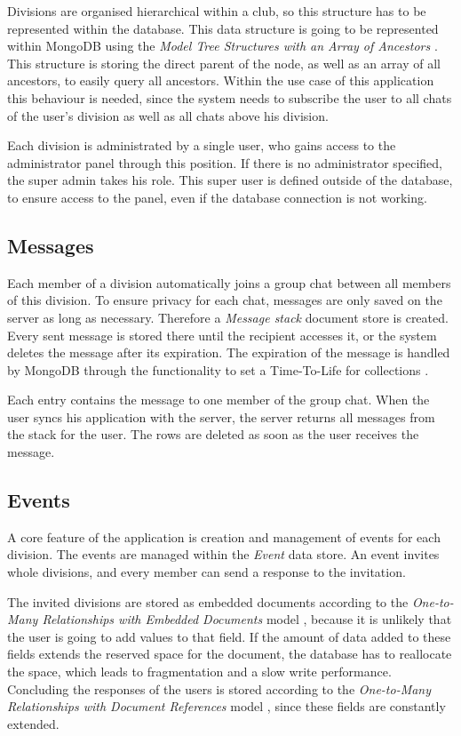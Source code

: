 Divisions are organised hierarchical within a club, so this structure has to be represented within the database. This data structure is going to be represented within MongoDB using the \emph{Model Tree Structures with an Array of Ancestors} \cite[p. 149]{Mongo:2014aa}. This structure is storing the direct parent of the node, as well as an array of all ancestors, to easily query all ancestors. Within the use case of this application this behaviour is needed, since the system needs to subscribe the user to all chats of the user's division as well as all chats above his division.

Each division is administrated by a single user, who gains access to the administrator panel through this position. If there is no administrator specified, the super admin takes his role. This super user is defined outside of the database, to ensure access to the panel, even if the database connection is not working.

\subsection{Messages}
Each member of a division automatically joins a group chat between all members of this division. To ensure privacy for each chat, messages are only saved on the server as long as necessary. Therefore a \emph{Message stack} document store is created. Every sent message is stored there until the recipient accesses it, or the system deletes the message after its expiration. The expiration of the message is handled by MongoDB through the functionality to set a Time-To-Life for collections \cite[p. 198]{Mongo:2014aa}.

Each entry contains the message to one member of the group chat. When the user syncs his application with the server, the server returns all messages from the stack for the user. The rows are deleted as soon as the user receives the message. 

\subsection{Events}
A core feature of the application is creation and management of events for each division. The events are managed within the \emph{Event} data store. An event invites whole divisions, and every member can send a response to the invitation. 

The invited divisions are stored as embedded documents according to the \emph{One-to-Many Relationships with Embedded Documents} model \cite[p. 141]{Mongo:2014aa}, because it is unlikely that the user is going to add values to that field. If the amount of data added to these fields extends the reserved space for the document, the database has to reallocate the space, which leads to fragmentation and a slow write performance. Concluding the responses of the users is stored according to the \emph{One-to-Many Relationships with Document References} model \cite[p. 143]{Mongo:2014aa}, since these fields are constantly extended.

